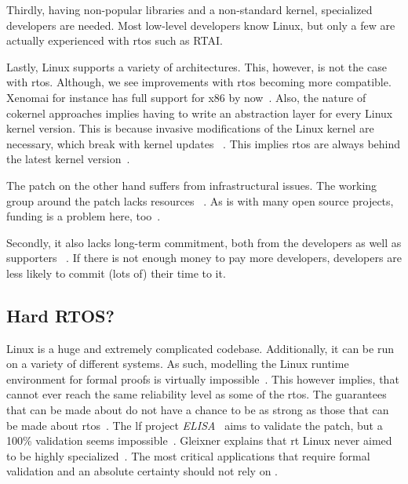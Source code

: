 \documentclass[10pt,twocolumn,a4paper]{article}
\begin{document}
Thirdly, having non-popular libraries and a non-standard kernel, specialized developers are needed.
Most low-level developers know Linux, but only a few are actually experienced with \acrshort{rtos} such as RTAI.

Lastly, Linux supports a variety of architectures.
This, however, is not the case with \acrshort{rtos}.
Although, we see improvements with \acrshort{rtos} becoming more compatible.
Xenomai for instance has full support for x86 by now~\cite{xenomai_supported}.
Also, the nature of cokernel approaches implies having to write an abstraction layer for every Linux kernel version.
This is because invasive modifications of the Linux kernel are necessary, which break with kernel updates ~\cite{reghenzani_realtime_2019}.
This implies \acrshort{rtos} are always behind the latest kernel version~\cite{xenomai-docs}.
\newline

\noindent The  patch on the other hand suffers from infrastructural issues.
The working group around the patch lacks resources ~\cite{perlow_trenches_2021}.
As is with many open source projects, funding is a problem here, too~\cite{perlow_trenches_2021}.

Secondly, it also lacks long-term commitment, both from the developers as well as supporters ~\cite{perlow_trenches_2021}.
If there is not enough money to pay more developers, developers are less likely to commit (lots of) their time to it.


\subsection{Hard RTOS?}
Linux is a huge and extremely complicated codebase.
Additionally, it can be run on a variety of different systems.
As such, modelling the Linux runtime environment for formal proofs is virtually impossible~\cite{reghenzani_realtime_2019}.
This however implies, that  cannot ever reach the same reliability level as some of the \acrshort{rtos}.
The guarantees that can be made about  do not have a chance to be as strong as those that can be made about \acrshort{rtos}~\cite{reghenzani_realtime_2019}.
The \acrfull{lf} project \emph{ELISA}~\cite{elisa_2025} aims to validate the patch, but a 100\% validation seems impossible~\cite{perlow_trenches_2021}.
Gleixner explains that \acrshort{rt} Linux never aimed to be highly specialized~\cite{perlow_trenches_2021}.
The most critical applications that require formal validation and an absolute certainty should not rely on .
\end{document}
